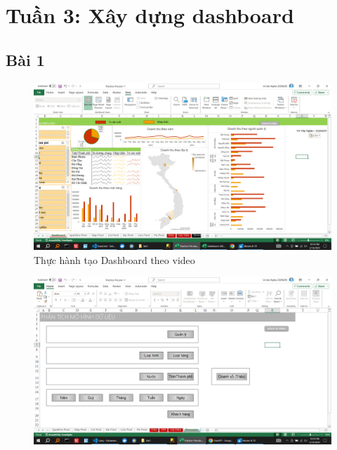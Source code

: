 \documentclass{article}
\begin{document}
\tableofcontents
\newpage
\listoffigures
\newpage
\section{Tuần 3: Xây dựng dashboard}
\subsection{Bài 1}

\begin{figure}[H]
\centering
\includegraphics[scale = 0.15]{Bai1/ThucHanh/0.png}
\caption{Thực hành tạo Dashboard theo video}
\end{figure}






\begin{figure}[H]
\centering
\includegraphics[scale = 0.15]{Bai1/ThucHanh/1.png}
\end{figure}
\end{document}
